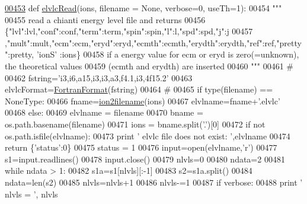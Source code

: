 \begin{DoxyCode}
\hypertarget{namespacepyneb_1_1utils_1_1__chianti__tools_l00453}{}\hyperlink{namespacepyneb_1_1utils_1_1__chianti__tools_ac848d0b5ea14bf4adf6e8cd5d46fb639}{00453} \textcolor{keyword}{def }\hyperlink{namespacepyneb_1_1utils_1_1__chianti__tools_ac848d0b5ea14bf4adf6e8cd5d46fb639}{elvlcRead}(ions, filename = None, verbose=0,  useTh=1):
00454     \textcolor{stringliteral}{"""}
00455 \textcolor{stringliteral}{    read a chianti energy level file and returns}
00456 \textcolor{stringliteral}{    \{"lvl":lvl,"conf":conf,"term":term,"spin":spin,"l":l,"spd":spd,"j":j}
00457 \textcolor{stringliteral}{    ,"mult":mult,"ecm":ecm,"eryd":eryd,"ecmth":ecmth,"erydth":erydth,"ref":ref,"pretty":pretty, 'ionS'
      :ions\}}
00458 \textcolor{stringliteral}{    if a energy value for ecm or eryd is zero(=unknown), the theoretical values}
00459 \textcolor{stringliteral}{    (ecmth and erydth) are inserted}
00460 \textcolor{stringliteral}{    """}
00461     \textcolor{comment}{#}
00462     fstring=\textcolor{stringliteral}{'i3,i6,a15,i3,i3,a3,f4.1,i3,4f15.2'}
00463     elvlcFormat=\hyperlink{classpyneb_1_1utils_1_1_fortran_format_1_1_fortran_format}{FortranFormat}(fstring)
00464     \textcolor{comment}{#}
00465     \textcolor{keywordflow}{if} type(filename) == NoneType:
00466         fname=\hyperlink{namespacepyneb_1_1utils_1_1__chianti__tools_ad4bc7b577fd4c3819ceb00b0a444351b}{ion2filename}(ions)
00467         elvlname=fname+\textcolor{stringliteral}{'.elvlc'}
00468     \textcolor{keywordflow}{else}:
00469         elvlname = filename
00470         bname = os.path.basename(filename)
00471         ions = bname.split(\textcolor{stringliteral}{'.'})[0]
00472     \textcolor{keywordflow}{if} \textcolor{keywordflow}{not} os.path.isfile(elvlname):
00473         \textcolor{keywordflow}{print} \textcolor{stringliteral}{' elvlc file does not exist:  '},elvlname
00474         \textcolor{keywordflow}{return} \{\textcolor{stringliteral}{'status'}:0\}
00475     status = 1
00476     input=open(elvlname,\textcolor{stringliteral}{'}\textcolor{stringliteral}{r')}
00477 \textcolor{stringliteral}{    s1=input.readlines()}
00478 \textcolor{stringliteral}{    input.close()}
00479 \textcolor{stringliteral}{    nlvls=0}
00480 \textcolor{stringliteral}{    ndata=2}
00481 \textcolor{stringliteral}{    }\textcolor{keywordflow}{while} ndata > 1:
00482         s1a=s1[nlvls][:-1]
00483         s2=s1a.split()
00484         ndata=len(s2)
00485         nlvls=nlvls+1
00486     nlvls-=1
00487     \textcolor{keywordflow}{if} verbose:
00488         \textcolor{keywordflow}{print} \textcolor{stringliteral}{' nlvls = '}, nlvls

\end{DoxyCode}
